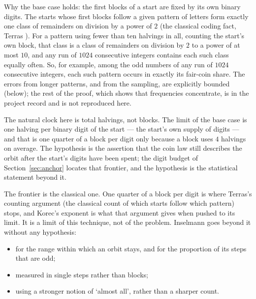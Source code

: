 \documentclass[11pt]{article}
\theoremstyle{remark}
\begin{document}
Why the base case holds: the first blocks of a start are fixed by its own binary digits. The starts whose first blocks follow a given pattern of letters form exactly one class of remainders on division by a power of $2$ (the classical coding fact, Terras \cite{terras}). For a pattern using fewer than ten halvings in all, counting the start's own block, that class is a class of remainders on division by $2$ to a power of at most $10$, and any run of $1024$ consecutive integers contains each such class equally often. So, for example, among the odd numbers of any run of $1024$ consecutive integers, each such pattern occurs in exactly its fair-coin share. The errors from longer patterns, and from the sampling, are explicitly bounded (below); the rest of the proof, which shows that frequencies concentrate, is in the project record and is not reproduced here.

The natural clock here is total halvings, not blocks. The limit of the base case is one halving per binary digit of the start --- the start's own supply of digits --- and that is one quarter of a block per digit only because a block uses $4$ halvings on average. The hypothesis is the assertion that the coin law still describes the orbit after the start's digits have been spent; the digit budget of Section~\ref{sec:anchor} locates that frontier, and the hypothesis is the statistical statement beyond it.

The frontier is the classical one. One quarter of a block per digit is where Terras's counting argument (the classical count of which starts follow which pattern) stops, and Korec's exponent \cite{korec} is what that argument gives when pushed to its limit. It is a limit of this technique, not of the problem. Inselmann \cite{inselmann} goes beyond it without any hypothesis:
\begin{itemize}
\item for the range within which an orbit stays, and for the proportion of its steps that are odd;
\item measured in single steps rather than blocks;
\item using a stronger notion of `almost all', rather than a sharper count.
\end{itemize}
\end{document}
